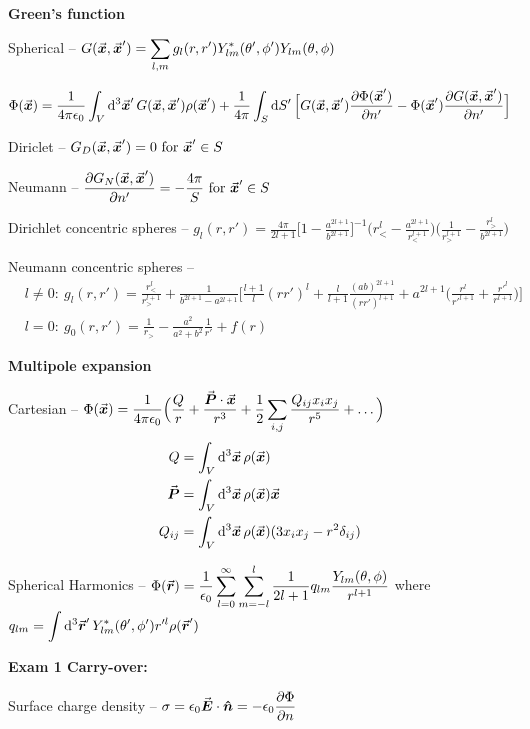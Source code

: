 \textbf{Green's function}

Spherical -- $\displaystyle G(\va*{x},\va*{x}') = \sum_{l,m} g_{l}(r,r') Y_{lm}^{*}(\theta',\phi') Y_{lm}(\theta,\phi)$


$\displaystyle \Phi(\va*{x}) = \frac{1}{4 \pi \epsilon_0} \int_{V} \dd[3]{\va*{x}'} G(\va*{x},\va*{x}') \rho(\va*{x}') + \frac{1}{4\pi} \int_{S} \dd{S'} \Big[ G(\va*{x},\va*{x}') \pdv{\Phi(\va*{x}')}{n'} - \Phi(\va*{x}') \pdv{G(\va*{x},\va*{x}')}{n'} \Big]$

Diriclet -- $G_{D}(\va*{x},\va*{x}') = 0~{\rm for}~\va*{x}' \in S$

Neumann -- $\displaystyle \pdv{G_{N}(\va*{x},\va*{x}')}{n'} = -\frac{4 \pi}{S}~{\rm for}~\va*{x}' \in S$

Dirichlet concentric spheres -- $\displaystyle g_{l}(r,r') = \frac{4 \pi}{2l+1} \Big[ 1 - \frac{a^{2l+1}}{b^{2l+1}} \Big]^{-1} \Big( r_{<}^{l} - \frac{a^{2l+1}}{r_{<}^{l+1}} \Big) \Big( \frac{1}{r_{>}^{l+1}} - \frac{r_{>}^{l}}{b^{2l+1}} \Big)$

Neumann concentric spheres -- 
\begin{align}
    &l \ne 0:~ g_{l}(r,r') = \frac{r_{<}^{l}}{r_{>}^{l+1}} + \frac{1}{b^{2l+1} - a^{2l+1}} \Big[ \frac{l+1}{l} (r r')^{l} + \frac{l}{l+1} \frac{(a b)^{2l+1}}{(r r')^{l+1}} + a^{2l+1} \Big( \frac{r^{l}}{r'^{l+1}} + \frac{r'^{l}}{r^{l+1}} \Big) \Big] \\
    &l = 0:~g_{0}(r,r') = \frac{1}{r_{>}} - \frac{a^2}{a^2 + b^2} \frac{1}{r'} + f(r)
\end{align}

\textbf{Multipole expansion}

Cartesian -- $\displaystyle \Phi(\va*{x}) = \frac{1}{4 \pi \epsilon_0} \Big( \frac{Q}{r} + \frac{\va*{P} \cdot \va*{x}}{r^3} + \frac{1}{2} \sum_{i,j} \frac{Q_{ij} x_{i}x_{j}}{r^{5}} + \ldots \Big)$
\begin{align}
    Q &= \int_{V} \dd[3]{\va*{x}} \rho(\va*{x}) \\
    \va*{P} &= \int_{V} \dd[3]{\va*{x}} \rho(\va*{x}) \va*{x} \\
    Q_{ij} &= \int_{V} \dd[3]{\va*{x}} \rho(\va*{x})( 3x_{i}x_{j} - r^2 \delta_{ij} )
\end{align}

Spherical Harmonics -- $\displaystyle \Phi(\va*{r}) = \frac{1}{\epsilon_0} \sum_{l=0}^{\infty} \sum_{m=-l}^{l} \frac{1}{2l+1} q_{lm} \frac{Y_{lm}(\theta,\phi)}{r^{l+1}}$ where $\displaystyle q_{lm} = \int \dd[3]{\va*{r}'} Y_{lm}^{*}(\theta',\phi') r'^{l} \rho(\va*{r}')$


\textbf{Exam 1 Carry-over:}

Surface charge density -- $\displaystyle \sigma = \epsilon_0 \va*{E} \cdot \vu*{n} = - \epsilon_0 \pdv{\Phi}{n}$






